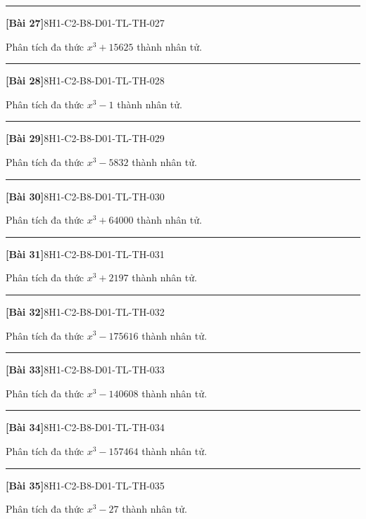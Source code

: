 \documentclass[12pt,a4paper]{article}
\newif\ifloigiai
\newenvironment{cauhoi}[2]{%
  \par\medskip\noindent\rule{\textwidth}{0.4pt}\par\nopagebreak
  \noindent\textbf{[#1]}\hfill{\scriptsize\ttfamily #2}\par\nopagebreak\smallskip}{\par}
\newcommand{\loigiai}[1]{\ifloigiai\par\smallskip\noindent\textit{Lời giải.} #1\par\fi}
\begin{document}
\begin{cauhoi}{Bài 27}{8H1-C2-B8-D01-TL-TH-027}
Phân tích đa thức $x^{3}+15625$ thành nhân tử.
\loigiai{Áp dụng hằng đẳng thức $a^{3}+b^{3}=(a+b)(a^{2}-ab+b^{2})$ với $b=25$: $x^{3}+15625=(x+25)(x^{2}-25x+625)$.}
\end{cauhoi}
\begin{cauhoi}{Bài 28}{8H1-C2-B8-D01-TL-TH-028}
Phân tích đa thức $x^{3}-1$ thành nhân tử.
\loigiai{Áp dụng hằng đẳng thức $a^{3}-b^{3}=(a-b)(a^{2}+ab+b^{2})$ với $b=1$: $x^{3}-1=(x-1)(x^{2}+x+1)$.}
\end{cauhoi}
\begin{cauhoi}{Bài 29}{8H1-C2-B8-D01-TL-TH-029}
Phân tích đa thức $x^{3}-5832$ thành nhân tử.
\loigiai{Áp dụng hằng đẳng thức $a^{3}-b^{3}=(a-b)(a^{2}+ab+b^{2})$ với $b=18$: $x^{3}-5832=(x-18)(x^{2}+18x+324)$.}
\end{cauhoi}
\begin{cauhoi}{Bài 30}{8H1-C2-B8-D01-TL-TH-030}
Phân tích đa thức $x^{3}+64000$ thành nhân tử.
\loigiai{Áp dụng hằng đẳng thức $a^{3}+b^{3}=(a+b)(a^{2}-ab+b^{2})$ với $b=40$: $x^{3}+64000=(x+40)(x^{2}-40x+1600)$.}
\end{cauhoi}
\begin{cauhoi}{Bài 31}{8H1-C2-B8-D01-TL-TH-031}
Phân tích đa thức $x^{3}+2197$ thành nhân tử.
\loigiai{Áp dụng hằng đẳng thức $a^{3}+b^{3}=(a+b)(a^{2}-ab+b^{2})$ với $b=13$: $x^{3}+2197=(x+13)(x^{2}-13x+169)$.}
\end{cauhoi}
\begin{cauhoi}{Bài 32}{8H1-C2-B8-D01-TL-TH-032}
Phân tích đa thức $x^{3}-175616$ thành nhân tử.
\loigiai{Áp dụng hằng đẳng thức $a^{3}-b^{3}=(a-b)(a^{2}+ab+b^{2})$ với $b=56$: $x^{3}-175616=(x-56)(x^{2}+56x+3136)$.}
\end{cauhoi}
\begin{cauhoi}{Bài 33}{8H1-C2-B8-D01-TL-TH-033}
Phân tích đa thức $x^{3}-140608$ thành nhân tử.
\loigiai{Áp dụng hằng đẳng thức $a^{3}-b^{3}=(a-b)(a^{2}+ab+b^{2})$ với $b=52$: $x^{3}-140608=(x-52)(x^{2}+52x+2704)$.}
\end{cauhoi}
\begin{cauhoi}{Bài 34}{8H1-C2-B8-D01-TL-TH-034}
Phân tích đa thức $x^{3}-157464$ thành nhân tử.
\loigiai{Áp dụng hằng đẳng thức $a^{3}-b^{3}=(a-b)(a^{2}+ab+b^{2})$ với $b=54$: $x^{3}-157464=(x-54)(x^{2}+54x+2916)$.}
\end{cauhoi}
\begin{cauhoi}{Bài 35}{8H1-C2-B8-D01-TL-TH-035}
Phân tích đa thức $x^{3}-27$ thành nhân tử.
\loigiai{Áp dụng hằng đẳng thức $a^{3}-b^{3}=(a-b)(a^{2}+ab+b^{2})$ với $b=3$: $x^{3}-27=(x-3)(x^{2}+3x+9)$.}
\end{cauhoi}
\end{document}
